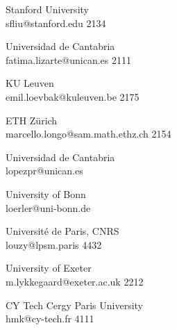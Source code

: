 \begin{multicols}{2}
 {Stanford University\\}%
 {sfliu@stanford.edu}%
 {2134} %
 {} %
 {} %
 {} %
 {} %

 {Universidad de Cantabria\\}%
 {fatima.lizarte@unican.es}%
 {2111} %
 {} %
 {} %
 {} %
 {} %

 {KU Leuven\\}%
 {emil.loevbak@kuleuven.be}%
 {2175} %
 {} %
 {} %
 {} %
 {} %

 {ETH Z\"{u}rich\\}%
 {marcello.longo@sam.math.ethz.ch}%
 {2154} %
 {} %
 {} %
 {} %
 {} %

 {Universidad de Cantabria\\}%
 {lopezpr@unican.es}%
 {} %
 {} %
 {} %
 {} %
 {} %

 {University of Bonn\\}%
 {loerler@uni-bonn.de}%
 {} %
 {} %
 {} %
 {} %
 {} %

 {Universit{\'e} de Paris, CNRS\\}%
 {louzy@lpsm.paris}%
 {4432} %
 {} %
 {} %
 {} %
 {} %

 {University of Exeter\\}%
 {m.lykkegaard@exeter.ac.uk}%
 {2212} %
 {} %
 {} %
 {} %
 {} %

 {CY Tech Cergy Paris University\\}%
 {hmk@cy-tech.fr}%
 {4111} %
 {} %
 {} %
 {} %
 {} %


\end{multicols}

